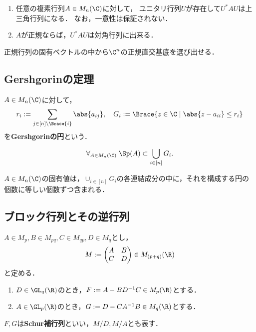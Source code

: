 \documentclass[uplatex, dvipdfmx]{jsreport}
\begin{document}
\begin{theorem}\mbox{}
    \begin{enumerate}
        \item 任意の複素行列$A\in M_n(\C)$に対して，
        ユニタリ行列$U$が存在して$U^*AU$は上三角行列になる．
        なお，一意性は保証されない．
        \item $A$が正規ならば，$U^*AU$は対角行列に出来る．
    \end{enumerate}
\end{theorem}
\begin{remarks}
    正規行列の固有ベクトルの中から$\C^n$の正規直交基底を選び出せる．
\end{remarks}

\subsection{Gershgorinの定理}

\begin{definition}
    $A\in M_n(\C)$に対して，
    \[r_i:=\sum_{j\in[n]\setminus\Brace{i}}\abs{a_{ij}},\quad G_i:=\Brace{z\in\C\mid\abs{z-a_{ii}}\le r_i}\]
    を\textbf{Gershgorinの円}という．
\end{definition}

\begin{theorem}[Gershgorin]
    \[\forall_{A\in M_n(\C)}\;\Sp(A)\subset \bigcup_{i\in[n]}G_i.\]
\end{theorem}

\begin{proposition}
    $A\in M_n(\C)$の固有値は，$\cup_{i\in[n]}G_i$の各連結成分の中に，それを構成する円の個数に等しい個数ずつ含まれる．
\end{proposition}

\subsection{ブロック行列とその逆行列}

\begin{notation}
    $A\in M_{p},B\in M_{pq},C\in M_{qp},D\in M_q$とし，
    \[M:=\begin{pmatrix}A&B\\C&D\end{pmatrix}\in M_{(p+q)}(\R)\]
    と定める．
    \begin{enumerate}
        \item $D\in\GL_q(\R)$のとき，$F:=A-BD^{-1}C\in M_{p}(\R)$とする．
        \item $A\in\GL_p(\R)$のとき，$G:=D-CA^{-1}B\in M_q(\R)$とする．
    \end{enumerate}
    $F,G$は\textbf{Schur補行列}といい，$M/D,M/A$とも表す．
\end{notation}
\end{document}
